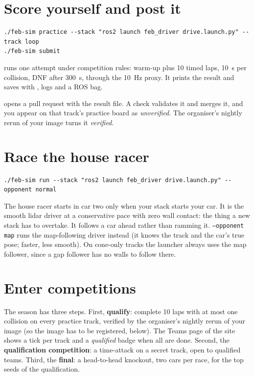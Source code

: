 \documentclass[11pt,a4paper]{article}
\begin{document}
\section{Score yourself and post it}

\begin{lstlisting}
./feb-sim practice --stack "ros2 launch feb_driver drive.launch.py" --track loop
./feb-sim submit
\end{lstlisting}

 runs one attempt under competition rules: warm-up plus 10 timed laps, 10~s per
collision, DNF after 300~s, through the 10~Hz proxy. It prints the result and saves
 with , logs and a ROS bag.

 opens a pull request with the result file. A check validates it and merges it,
and you appear on that track's practice board as \emph{unverified}. The organiser's nightly
rerun of your image turns it \emph{verified}.

\section{Race the house racer}

\begin{lstlisting}
./feb-sim run --stack "ros2 launch feb_driver drive.launch.py" --opponent normal
\end{lstlisting}

The house racer starts in car two only when your stack starts your car. It is the smooth
lidar driver at a conservative pace with zero wall contact: the thing a new stack has to
overtake. It follows a car ahead rather than ramming it. \texttt{--opponent map} runs the
map-following driver instead (it knows the track and the car's true pose; faster, less
smooth). On cone-only tracks the launcher always uses the map follower, since a gap
follower has no walls to follow there.

\section{Enter competitions}

The season has three steps. First, \textbf{qualify}: complete 10 laps with at most one
collision on every practice track, verified by the organiser's nightly rerun of your image
(so the image has to be registered, below). The Teams page of the site shows a tick per
track and a \emph{qualified} badge when all are done. Second, the \textbf{qualification
competition}: a time-attack on a secret track, open to qualified teams. Third, the
\textbf{final}: a head-to-head knockout, two cars per race, for the top seeds of the
qualification.
\end{document}
